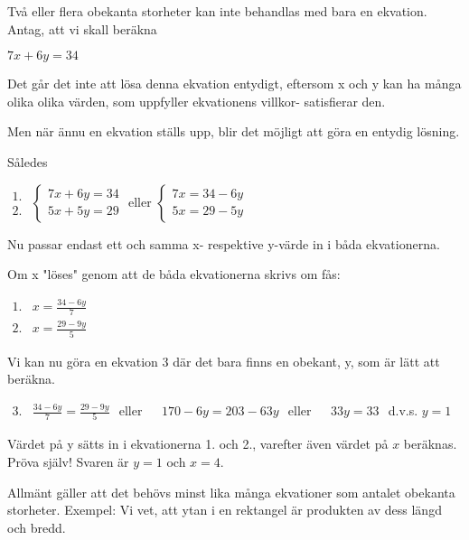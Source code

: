 Två eller flera obekanta storheter kan inte behandlas med bara en ekvation.
Antag, att vi skall beräkna

$7x+6y=34$

Det går det inte att lösa denna ekvation entydigt, eftersom x och y kan ha många
olika olika värden, som uppfyller ekvationens villkor- satisfierar den.

Men när ännu en ekvation ställs upp, blir det möjligt att göra en entydig
lösning.

Således

$
\begin{array}{c}
1.\\2.
\end{array}
$ $
\left\{
\begin{array}{l}
7x + 6y = 34\\
5x + 5y = 29
\end{array}
\right.
$ eller $
\left\{
\begin{array}{l}
7x = 34 - 6y\\
5x = 29 - 5y 
\end{array}
\right. 
$

Nu passar endast ett och samma x- respektive y-värde in i båda ekvationerna.

Om x "löses" genom att de båda ekvationerna skrivs om fås:

$
\begin{array}{ll}
1. & x = \frac{34-6y}{7}\\
2. & x = \frac{29-9y}{5}
\end{array}
$

Vi kan nu göra en ekvation 3 där det bara finns en obekant, y, som är lätt
att beräkna.

$
\begin{array}{ll}
3. & \frac{34 - 6y}{7} = \frac{29 - 9y}{5}
\end{array}
$ eller
$
\begin{array}{ll}
 & 170 - 6y = 203-63y
\end{array}
$ eller
$
\begin{array}{ll}
 & 33y = 33
\end{array}
$ d.v.s. $y = 1$

Värdet på y sätts in i ekvationerna 1. och 2., varefter även värdet på $x$
beräknas.
Pröva själv! Svaren är $y = 1$ och $x = 4$.

Allmänt gäller att det behövs minst lika många ekvationer som antalet obekanta
storheter.
Exempel:
Vi vet, att ytan i en rektangel är produkten av dess längd och bredd.

